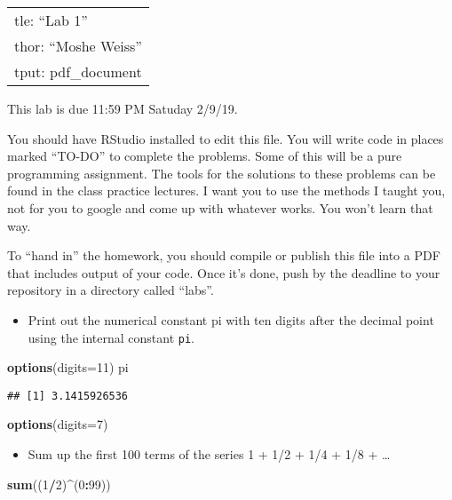 \documentclass[]{article}
\title{}
\author{}
\date{}
\newenvironment{Shaded}{\begin{snugshade}}{\end{snugshade}}
\newcommand{\KeywordTok}[1]{\textcolor[rgb]{0.13,0.29,0.53}{\textbf{#1}}}
\newcommand{\DataTypeTok}[1]{\textcolor[rgb]{0.13,0.29,0.53}{#1}}
\newcommand{\DecValTok}[1]{\textcolor[rgb]{0.00,0.00,0.81}{#1}}
\newcommand{\OperatorTok}[1]{\textcolor[rgb]{0.81,0.36,0.00}{\textbf{#1}}}
\newcommand{\NormalTok}[1]{#1}
\providecommand{\tightlist}{%
  \setlength{\itemsep}{0pt}\setlength{\parskip}{0pt}}
\begin{document}
\begin{longtable}[]{@{}l@{}}
\toprule
tle: ``Lab 1''\tabularnewline
thor: ``Moshe Weiss''\tabularnewline
tput: pdf\_document\tabularnewline
\bottomrule
\end{longtable}

This lab is due 11:59 PM Satuday 2/9/19.

You should have RStudio installed to edit this file. You will write code
in places marked ``TO-DO'' to complete the problems. Some of this will
be a pure programming assignment. The tools for the solutions to these
problems can be found in the class practice lectures. I want you to use
the methods I taught you, not for you to google and come up with
whatever works. You won't learn that way.

To ``hand in'' the homework, you should compile or publish this file
into a PDF that includes output of your code. Once it's done, push by
the deadline to your repository in a directory called ``labs''.

\begin{itemize}
\tightlist
\item
  Print out the numerical constant pi with ten digits after the decimal
  point using the internal constant \texttt{pi}.
\end{itemize}

\begin{Shaded}
\begin{Highlighting}[]
\KeywordTok{options}\NormalTok{(}\DataTypeTok{digits=}\DecValTok{11}\NormalTok{)}
\NormalTok{pi}
\end{Highlighting}
\end{Shaded}

\begin{verbatim}
## [1] 3.1415926536
\end{verbatim}

\begin{Shaded}
\begin{Highlighting}[]
\KeywordTok{options}\NormalTok{(}\DataTypeTok{digits=}\DecValTok{7}\NormalTok{)}
\end{Highlighting}
\end{Shaded}

\begin{itemize}
\tightlist
\item
  Sum up the first 100 terms of the series 1 + 1/2 + 1/4 + 1/8 +
  \ldots{}
\end{itemize}

\begin{Shaded}
\begin{Highlighting}[]
\KeywordTok{sum}\NormalTok{((}\DecValTok{1}\OperatorTok{/}\DecValTok{2}\NormalTok{)}\OperatorTok{^}\NormalTok{(}\DecValTok{0}\OperatorTok{:}\DecValTok{99}\NormalTok{))}
\end{Highlighting}
\end{Shaded}
\end{document}
